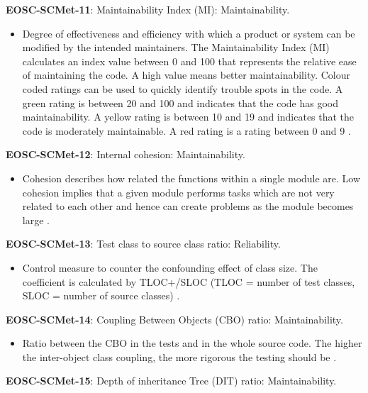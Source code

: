 \textbf{EOSC-SCMet-11}: Maintainability Index (MI): Maintainability.

\begin{itemize}
    \item Degree of effectiveness and efficiency with which a product or system can be modified by the intended maintainers. The Maintainability Index (MI) calculates an index value between 0 and 100 that represents the relative ease of maintaining the code. A high value means better maintainability. Colour coded ratings can be used to quickly identify trouble spots in the code. A green rating is between 20 and 100 and indicates that the code has good maintainability. A yellow rating is between 10 and 19 and indicates that the code is moderately maintainable. A red rating is a rating between 0 and 9 \cite{iso_25010_2011_2017,montagud_systematic_2012}.
\end{itemize}

\textbf{EOSC-SCMet-12}: Internal cohesion: Maintainability.

\begin{itemize}
    \item Cohesion describes how related the functions within a single module are. Low cohesion implies that a given module performs tasks which are not very related to each other and hence can create problems as the module becomes large \cite{iso_iec_24765_2017,montagud_systematic_2012}.
\end{itemize}

\textbf{EOSC-SCMet-13}: Test class to source class ratio: Reliability.

\begin{itemize}
    \item Control measure to counter the confounding effect of class size. The coefficient is calculated by TLOC+/SLOC  (TLOC = number of test classes, SLOC = number of source classes) \cite{nagappan_early_2005}.
\end{itemize}

\textbf{EOSC-SCMet-14}: Coupling Between Objects (CBO) ratio: Maintainability.

\begin{itemize}
    \item Ratio between the CBO in the tests and in the whole source code. The higher the inter-object class coupling, the more rigorous the testing should be \cite{nagappan_early_2005}.
\end{itemize}

\textbf{EOSC-SCMet-15}: Depth of inheritance Tree (DIT) ratio: Maintainability.

